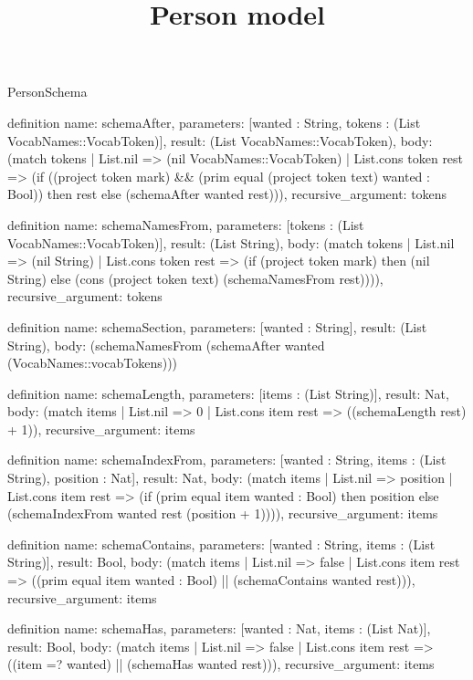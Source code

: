 \begin{lexlean}{PersonSchema}
\title{Person model}
\begin{semanticmodule}
definition{
  name: schemaAfter,
  parameters: [wanted : String, tokens : (List VocabNames::VocabToken)],
  result: (List VocabNames::VocabToken),
  body: (match tokens
    | List.nil => (nil VocabNames::VocabToken)
    | List.cons token rest => (if ((project token mark) && (prim equal (project token text) wanted : Bool)) then rest else (schemaAfter wanted rest))),
  recursive_argument: tokens
}

definition{
  name: schemaNamesFrom,
  parameters: [tokens : (List VocabNames::VocabToken)],
  result: (List String),
  body: (match tokens
    | List.nil => (nil String)
    | List.cons token rest => (if (project token mark) then (nil String) else (cons (project token text) (schemaNamesFrom rest)))),
  recursive_argument: tokens
}

definition{
  name: schemaSection,
  parameters: [wanted : String],
  result: (List String),
  body: (schemaNamesFrom (schemaAfter wanted (VocabNames::vocabTokens)))
}

definition{
  name: schemaLength,
  parameters: [items : (List String)],
  result: Nat,
  body: (match items | List.nil => 0 | List.cons item rest => ((schemaLength rest) + 1)),
  recursive_argument: items
}

definition{
  name: schemaIndexFrom,
  parameters: [wanted : String, items : (List String), position : Nat],
  result: Nat,
  body: (match items
    | List.nil => position
    | List.cons item rest => (if (prim equal item wanted : Bool) then position else (schemaIndexFrom wanted rest (position + 1)))),
  recursive_argument: items
}

definition{
  name: schemaContains,
  parameters: [wanted : String, items : (List String)],
  result: Bool,
  body: (match items
    | List.nil => false
    | List.cons item rest => ((prim equal item wanted : Bool) || (schemaContains wanted rest))),
  recursive_argument: items
}

definition{
  name: schemaHas,
  parameters: [wanted : Nat, items : (List Nat)],
  result: Bool,
  body: (match items
    | List.nil => false
    | List.cons item rest => ((item =? wanted) || (schemaHas wanted rest))),
  recursive_argument: items
}


\end{semanticmodule}
\end{lexlean}
